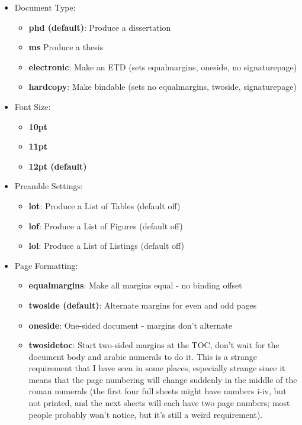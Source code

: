 \documentclass[phd,hardcopy,twosidetoc,letterpaper,chaptercenter,parttop,lol,lof,lot]{byumsphd}
\begin{document}
\begin{itemize}
    \item Document Type:
        \begin{itemize}
            \item \textbf{phd (default)}: Produce a dissertation
            \item \textbf{ms} Produce a thesis
            \item \textbf{electronic}: Make an ETD (sets equalmargins, oneside, no signaturepage)
            \item \textbf{hardcopy}: Make bindable (sets no equalmargins, twoside, signaturepage)
        \end{itemize}
\pagebreak
    \item Font Size:
        \begin{itemize}
            \item \textbf{10pt}
            \item \textbf{11pt}
            \item \textbf{12pt (default)}
        \end{itemize}
    \item Preamble Settings:
        \begin{itemize}
            \item \textbf{lot}: Produce a List of Tables (default off)
            \item \textbf{lof}: Produce a List of Figures (default off)
            \item \textbf{lol}: Produce a List of Listings (default off)
        \end{itemize}
    \item Page Formatting:
        \begin{itemize}
            \item \textbf{equalmargins}: Make all margins equal - no binding offset
            \item \textbf{twoside (default)}: Alternate margins for even and odd pages
            \item \textbf{oneside}: One-sided document - margins don't alternate
            \item \textbf{twosidetoc}: Start two-sided margins at the TOC, don't wait for the document body and arabic numerals to do it.  This is a strange requirement that I have seen in some places, especially strange since it means that the page numbering will change suddenly in the middle of the roman numerals (the first four full sheets might have numbers i-iv, but not printed, and the next sheets will each have two page numbers; most people probably won't notice, but it's still a weird requirement).

\end{itemize}
\end{itemize}
\end{document}
